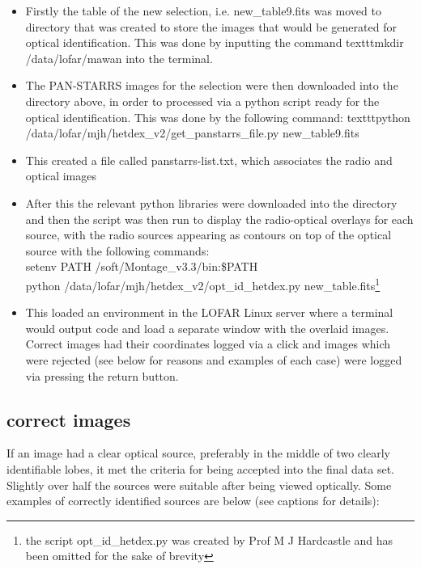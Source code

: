 \documentclass{article}
\begin{document}
\begin{itemize}
    \item Firstly the table of the new selection, i.e. new{\_}table9.fits was moved to directory that was created to store the images that would be generated for optical identification. This was done by inputting the command texttt{mkdir /data/lofar/mawan} into the terminal.
    \item The PAN-STARRS images for the selection were then downloaded into the directory above, in order to processed via a python script ready for the optical identification. This was done by the following command: texttt{python /data/lofar/mjh/hetdex{\_}v2/get{\_}panstarrs{\_}file.py new{\_}table9.fits}
    \item This created a file called panstarrs-list.txt, which associates the radio and optical images
    \item After this the relevant python libraries were downloaded into the directory and then the script was then run to display the radio-optical overlays for each source, with the radio sources appearing as contours on top of the optical source with the following commands:\\
    setenv PATH /soft/Montage{\_}v3.3/bin:{\$}PATH\\
    python /data/lofar/mjh/hetdex{\_}v2/opt{\_}id{\_}hetdex.py new{\_}table.fits\footnote{the script opt{\_}id{\_}hetdex.py was created by Prof M J Hardcastle and has been omitted for the sake of brevity}
    \item This loaded an environment in the LOFAR Linux server where a terminal would output code and load a separate window with the overlaid images. Correct images had their coordinates logged via a click and images which were rejected (see below for reasons and examples of each case) were logged via pressing the return button.
\end{itemize}

\subsection{correct images}
If an image had a clear optical source, preferably in the middle of two clearly identifiable lobes, it met the criteria for being accepted into the final data set. Slightly over half the sources were suitable after being viewed optically. Some examples of correctly identified sources are below (see captions for details):
\end{document}
